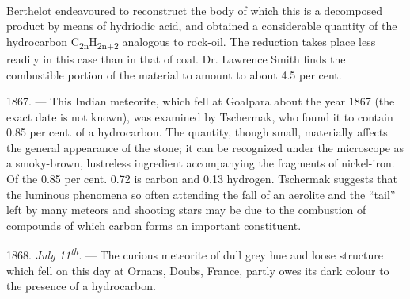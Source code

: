 \documentclass[a4paper, 11pt, oneside, english]{article}
\begin{document}
\paragraph{}
Berthelot endeavoured to reconstruct the body of which this is a decomposed product by means of hydriodic acid, and obtained a considerable quantity of the hydrocarbon C\textsubscript{2n}H\textsubscript{2n+2} analogous to rock-oil. The reduction takes place less readily in this case than in that of coal. Dr. Lawrence Smith finds the combustible portion of the material to amount to about 4.5 per cent.

1867. --- This Indian meteorite, which fell at Goalpara about the year 1867 (the exact date is not known), was examined by Tschermak, who found it to contain 0.85 per cent. of a hydrocarbon. The quantity, though small, materially affects the general appearance of the stone; it can be recognized under the microscope as a smoky-brown, lustreless ingredient accompanying the fragments of nickel-iron. Of the 0.85 per cent. 0.72 is carbon and 0.13 hydrogen. Tschermak suggests that the luminous phenomena so often attending the fall of an aerolite and the ``tail'' left by many meteors and shooting stars may be due to the combustion of compounds of which carbon forms an important constituent.

1868. \emph{July 11\textsuperscript{th}.} --- The curious meteorite of dull grey hue and loose structure which fell on this day at Ornans, Doubs, France, partly owes its dark colour to the presence of a hydrocarbon.
\end{document}
